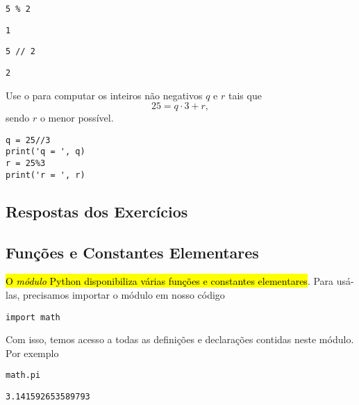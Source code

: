 \begin{lstlisting}
5 % 2
\end{lstlisting}

\begin{verbatim}
1
\end{verbatim}

\begin{lstlisting}
5 // 2
\end{lstlisting}

\begin{verbatim}
2
\end{verbatim}

\begin{exer}
  Use o {\python} para computar os inteiros não negativos $q$ e $r$ tais que
  \begin{equation}
    25 = q\cdot 3 + r,
  \end{equation}
  sendo $r$ o menor possível.
\end{exer}
\begin{resp}

\begin{lstlisting}
q = 25//3
print('q = ', q)
r = 25%3
print('r = ', r)
\end{lstlisting}

\end{resp}

\ifisbook 
\subsection*{Respostas dos Exercícios}
\shipoutAnswer
\fi


\subsection{Funções e Constantes Elementares}

\hl{O \emph{módulo} Python {\PYTHONmath} disponibiliza várias funções e constantes elementares}. Para usá-las, precisamos importar o módulo em nosso código

\begin{lstlisting}
import math
\end{lstlisting}

Com isso, temos acesso a todas as definições e declarações contidas neste módulo. Por exemplo

\begin{lstlisting}
math.pi
\end{lstlisting}

\begin{verbatim}
3.141592653589793
\end{verbatim}

